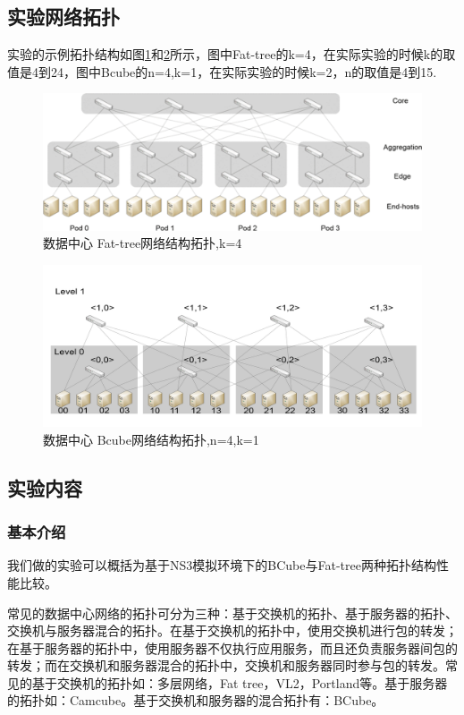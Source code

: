 \documentclass[lang=cn,11pt,a4paper,cite=authoryear]{elegantpaper}
\begin{document}
\subsection{实验网络拓扑}

实验的示例拓扑结构如图\ref{fig:screenshot050}和\ref{fig:screenshot051}所示，图中Fat-tree的k=4，在实际实验的时候k的取值是4到24，图中Bcube的n=4,k=1，在实际实验的时候k=2，n的取值是4到15.

\begin{figure}[htbp]
	\centering
	\includegraphics[width=0.7\linewidth]{image/screenshot050}
	\caption{数据中心 Fat-tree网络结构拓扑,k=4}
	\label{fig:screenshot050}
\end{figure}


\begin{figure}[htbp]
	\centering
	\includegraphics[width=0.7\linewidth]{image/screenshot051}
	\caption{数据中心 Bcube网络结构拓扑,n=4,k=1}
	\label{fig:screenshot051}
\end{figure}


\subsection{实验内容}

\subsubsection{基本介绍}

我们做的实验可以概括为基于NS3模拟环境下的BCube与Fat-tree两种拓扑结构性能比较。


常见的数据中心网络的拓扑可分为三种：基于交换机的拓扑、基于服务器的拓扑、交换机与服务器混合的拓扑。在基于交换机的拓扑中，使用交换机进行包的转发；在基于服务器的拓扑中，使用服务器不仅执行应用服务，而且还负责服务器间包的转发；而在交换机和服务器混合的拓扑中，交换机和服务器同时参与包的转发。常见的基于交换机的拓扑如：多层网络，Fat tree，VL2，Portland等。基于服务器的拓扑如：Camcube。基于交换机和服务器的混合拓扑有：BCube。
\end{document}
